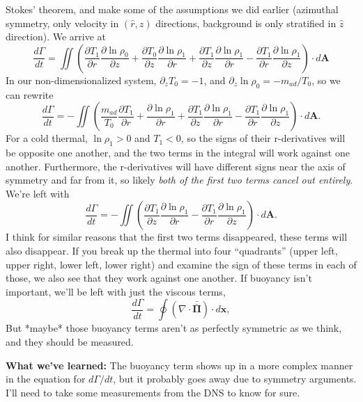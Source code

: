 \documentclass[onecolumn, amsmath, amsfonts, amssymb]{aastex62}
\newcommand{\grad}{\ensuremath{\nabla}}
\newcommand{\stressT}{\ensuremath{\bm{\bar{\bar{\Pi}}}}}
\begin{document}
Stokes' theorem, and make some of the assumptions we did earlier (azimuthal symmetry,
only velocity in $(\hat{r}, \hat{z})$ directions, background is only stratified in 
$\hat{z}$ direction). We arrive at
\begin{equation}
\frac{d\Gamma}{dt} = \iint\left( \frac{\partial T_1}{\partial r}\frac{\partial\ln\rho_0}{\partial z}
+ \frac{\partial T_0}{\partial z}\frac{\partial \ln\rho_1}{\partial r} 
+ \frac{\partial T_1}{\partial z}\frac{\partial \ln\rho_1}{\partial r} 
- \frac{\partial T_1}{\partial r}\frac{\partial \ln\rho_1}{\partial z}\right)
\cdot d\bm{A}
\end{equation}
In our non-dimensionalized system, $\partial_z T_0 = -1$, and 
$\partial_z \ln\rho_0 = -m_{ad}/T_0$, so we can rewrite
\begin{equation}
\frac{d\Gamma}{dt} = -\iint\left( \frac{m_{ad}}{T_0}\frac{\partial T_1}{\partial r}
+ \frac{\partial \ln\rho_1}{\partial r} 
+ \frac{\partial T_1}{\partial z}\frac{\partial \ln\rho_1}{\partial r} 
- \frac{\partial T_1}{\partial r}\frac{\partial \ln\rho_1}{\partial z}\right)
\cdot d\bm{A}.
\end{equation}
For a cold thermal, $\ln\rho_1 > 0$ and $T_1 < 0$, so the signs of their r-derivatives will be
opposite one another, and the two terms in the integral will work against one another. Furthermore,
the r-derivatives will have different signs near the axis of symmetry and far from it, so likely
\emph{both of the first two terms cancel out entirely}. We're left with
\begin{equation}
\frac{d\Gamma}{dt} = -\iint\left( 
\frac{\partial T_1}{\partial z}\frac{\partial \ln\rho_1}{\partial r} 
- \frac{\partial T_1}{\partial r}\frac{\partial \ln\rho_1}{\partial z}\right)
\cdot d\bm{A}.
\end{equation}
I think for similar reasons that the first two terms disappeared, these terms will also
disappear. If you break up the thermal into four ``quadrants'' (upper left, upper right,
lower left, lower right) and examine the sign of these terms in each of those, we also see
that they work against one another. If buoyancy isn't important, 
we'll be left with just the viscous terms,
\begin{equation}
\frac{d\Gamma}{dt} = \oint(\grad\cdot\stressT)\cdot d\bm{x},
\end{equation}
But *maybe* those buoyancy
terms aren't as perfectly symmetric as we think, and they should be measured.

\textbf{What we've learned:} The buoyancy term shows up in a more complex manner in the
equation for $d\Gamma/dt$, but it probably goes away due to symmetry arguments. I'll need
to take some measurements from the DNS to know for sure.



\end{document}

